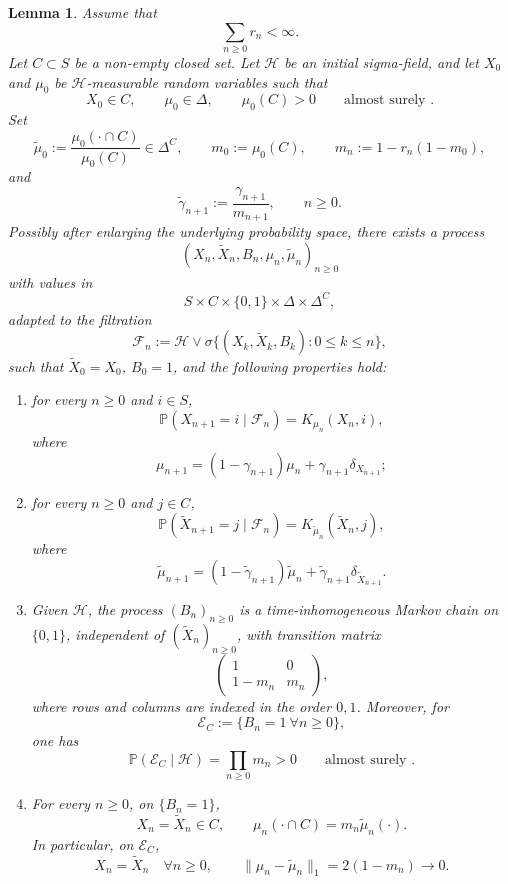 \documentclass[10pt,letterpaper]{article}
\theoremstyle{compactplain}
\newtheorem{lemma}[theorem]{Lemma}
\theoremstyle{compactdefinition}
\newcommand{\1}{\mathds{1}}
\begin{document}
\begin{lemma}
\label{lem:coupling-reduced}
Assume that
\[
\sum_{n\geq0}r_n<\infty.
\]
Let \(C\subset S\) be a non-empty closed set. Let \(\mathcal H\) be an initial
sigma-field, and let \(X_0\) and \(\mu_0\) be \(\mathcal H\)-measurable random
variables such that
\[
X_0\in C,
\qquad
\mu_0\in\Delta,
\qquad
\mu_0(C)>0
\qquad\text{almost surely }.
\]
Set
\[
\widetilde\mu_0:=\frac{\mu_0(\cdot\cap C)}{\mu_0(C)}\in\Delta^C,
\qquad
m_0:=\mu_0(C),
\qquad
m_n:=1-r_n(1-m_0),
\]
and
\[
\widetilde\gamma_{n+1}:=\frac{\gamma_{n+1}}{m_{n+1}},
\qquad n\geq0.
\]
Possibly after enlarging the underlying probability space, there exists a process
\[
(X_n,\widetilde X_n,B_n,\mu_n,\widetilde\mu_n)_{n\geq0}
\]
with values in
\[
S\times C\times\{0,1\}\times\Delta\times\Delta^C,
\]
adapted to the filtration
\[
\mathcal F_n
:=
\mathcal H\vee
\sigma\{(X_k,\widetilde X_k,B_k):0\leq k\leq n\},
\]
such that \(\widetilde X_0=X_0\), \(B_0=1\), and the following properties hold:
\begin{enumerate}[label=\textup{(\roman*)}]
\item for every \(n\geq0\) and \(i\in S\),
\[
\mathbb P(X_{n+1}=i\mid\mathcal F_n)=K_{\mu_n}(X_n,i),
\]
where
\[
\mu_{n+1}=(1-\gamma_{n+1})\mu_n+\gamma_{n+1}\delta_{X_{n+1}};
\] 
\item
for every \(n\geq0\) and \(j\in C\),
\[
\mathbb P(\widetilde X_{n+1}=j\mid\mathcal F_n)
=
K_{\widetilde\mu_n}(\widetilde X_n,j),
\]
where
\[
\widetilde\mu_{n+1}
=
(1-\widetilde\gamma_{n+1})\widetilde\mu_n
+
\widetilde\gamma_{n+1}\delta_{\widetilde X_{n+1}}.
\]

\item Given \(\mathcal H\), the process \((B_n)_{n\geq0}\) is a time-inhomogeneous Markov chain on \(\{0,1\}\), independent of \((\widetilde X_n)_{n\geq0}\), with transition matrix
\[
\begin{pmatrix}
1&0\\
1-m_n&m_n
\end{pmatrix},
\]
where rows and columns are indexed in the order \(0,1\). Moreover, for
\[
\mathcal E_C:=\{B_n=1\ \forall n\geq0\},
\]
one has
\[
\mathbb P(\mathcal E_C\mid\mathcal H)
=
\prod_{n\geq0}m_n
>
0
\qquad\text{almost surely }.
\]

\item
For every \(n\geq0\), on \(\{B_n=1\}\),
\[
X_n=\widetilde X_n\in C,
\qquad
\mu_n(\cdot\cap C)=m_n\widetilde\mu_n(\cdot).
\]
In particular, on \(\mathcal E_C\),
\[
X_n=\widetilde X_n
\quad\forall n\geq0,
\qquad
\|\mu_n-\widetilde\mu_n\|_1
=
2(1-m_n)
\longrightarrow0.
\]
\end{enumerate}
\end{lemma}
\end{document}
